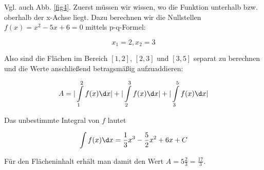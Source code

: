 \item

Vgl. auch Abb. \ref{fig4}. Zuerst müssen wir wissen, wo die Funktion unterhalb bzw. oberhalb der x-Achse liegt. Dazu berechnen wir die Nullstellen $f(x) = x^2-5x+6 = 0$ mittels p-q-Formel:

$$x_1 = 2, x_2 = 3$$

Also sind die Flächen im Bereich $[1,2]$, $[2,3]$ und $[3,5]$ separat zu berechnen und die Werte anschließend betragsmäßig aufzuaddieren:

$$A = | \int\limits_1^2 f(x) \d x | + | \int\limits_2^3 f(x) \d x | + | \int\limits_3^5 f(x) \d x | $$

Das unbestimmte Integral von $f$ lautet

$${\int f(x) \d x} = \frac{1}{3} x^3 - \frac{5}{2} x^2 + 6x + C$$

Für den Flächeninhalt erhält man damit den Wert $A=5\frac{2}{3} = \frac{17}{3}$.

